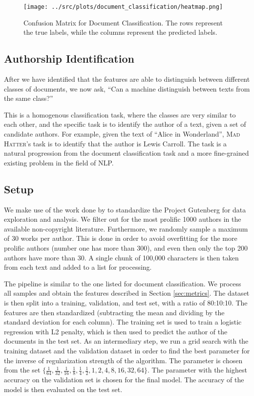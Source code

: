 \begin{figure}[htbp]
    \centering
    \texttt{[image: ../src/plots/document\_classification/heatmap.png]} 
    \caption{Confusion Matrix for Document Classification. The rows represent the true labels, while the columns represent the predicted labels.}
    \label{fig:cmatrix_document_classification}
\end{figure}

\subsection{Authorship Identification}
\label{sec:authorship_identification}
After we have identified that the features are able to distinguish between different classes of documents, we now ask, ``Can a machine distinguish between texts from the same class?'' 

This is a homogenous classification task, where the classes are very similar to each other, and the specific task is to identify the author of a text, given a set of candidate authors. 
For example, given the text of ``Alice in Wonderland'', \textsc{Mad Hatter}'s task is to identify that the author is Lewis Carroll. The task is a natural progression from the document classification task and a more fine-grained existing problem in the field of NLP. 

\subsection*{Setup}
We make use of the work done by \cite{gutenberg_dataset} to standardize the Project Gutenberg for data exploration and analysis. We filter out for the most prolific 1000 authors in the available non-copyright literature. Furthermore, we randomly sample a maximum of 30 works per author. This is done in order to avoid overfitting for the more prolific authors (number one has more than 300), and even then only the top 200 authors have more than 30. A single chunk of 100,000 characters is then taken from each text and added to a list for processing. 

The pipeline is similar to the one listed for document classification. We process all samples and obtain the features described in Section \ref{sec:metrics}. The dataset is then split into a training, validation, and test set, with a ratio of 80:10:10. The features are then standardized (subtracting the mean and dividing by the standard deviation for each column). The training set is used to train a logistic regression with L2 penalty, which is then used to predict the author of the documents in the test set. As an intermediary step, we run a grid search with the training dataset and the validation dataset in order to find the best parameter for the inverse of regularization strength of the algorithm. The parameter is chosen from the set $\{\frac{1}{64}, \frac{1}{32}, \frac{1}{16}, \frac{1}{8}, \frac{1}{4}, \frac{1}{2}, 1, 2, 4, 8 , 16, 32 , 64\}$. The parameter with the highest accuracy on the validation set is chosen for the final model. The accuracy of the model is then evaluated on the test set.

